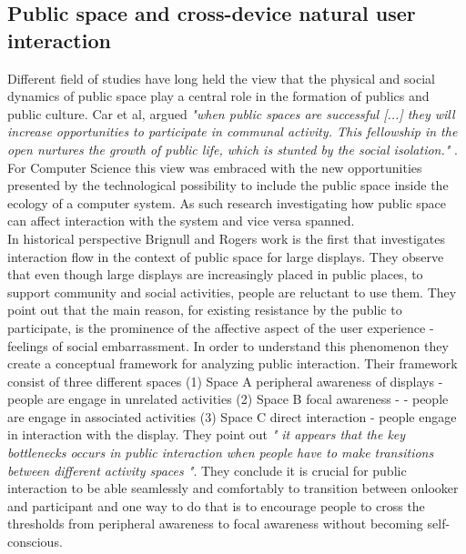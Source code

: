 \subsection{Public space and cross-device natural user interaction}
Different field of studies have long held the view that the physical and social dynamics of public space play a central role in the formation of publics and public culture. Car et al, argued \emph{"when public spaces are successful [...] they will increase opportunities to participate in communal activity. This fellowship in the open nurtures the growth of public life, which is stunted by the social isolation."} \cite{carr:1992}. For Computer Science this view was embraced with the new opportunities presented by the technological possibility to include the public space inside the ecology of a computer system. As such research investigating how public space can affect interaction with the system and vice versa spanned.\\

In historical perspective Brignull and Rogers work\cite{Brignull:2003} is the first that investigates interaction flow in the context of public space for large displays. They observe that even though large displays are increasingly placed in public places, to support community and social activities, people are reluctant to use them. They point out that the main reason, for existing resistance by the public to participate, is the prominence of the affective aspect of the  user experience - feelings of social embarrassment. In order to understand this phenomenon they create a conceptual framework for analyzing public interaction. Their framework consist of three different spaces (1) Space A peripheral awareness of displays - people are engage in unrelated activities (2) Space B focal awareness - - people are engage in associated activities (3) Space C direct interaction - people engage in interaction with the display. They point out \emph{" it appears that the key bottlenecks occurs in public interaction when people have to make transitions between different activity spaces "}. They conclude  it is crucial for public interaction to be able seamlessly and comfortably to transition between onlooker and participant and one way to do that is to encourage people to cross the thresholds from peripheral awareness to focal awareness without becoming self-conscious.\\

